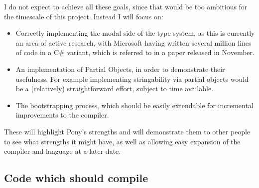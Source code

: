 \documentclass{article}
\begin{document}
I do not expect to achieve all these goals, since that would be too ambitious for the timescale of this project.
Instead I will focus on:
\begin{itemize}
\item Correctly implementing the modal side of the type system, as	this is currently an area of active research, with Microsoft having written several million lines of code in a C\# variant, which is referred to in a paper released in November\cite{microsoft2012}.
\item An implementation of Partial Objects, in order to demonstrate their usefulness.
	For example implementing stringability via partial objects would be a (relatively) straightforward effort, subject to time available.
\item The bootstrapping process, which should be easily extendable for incremental improvements to the compiler.
\end{itemize}

These will highlight Pony's strengths and will demonstrate them to other people to see what strengths it might have, as well as allowing easy expansion of the compiler and language at a later date.

\subsection{Code which should compile}
\end{document}

